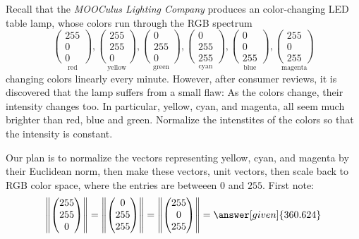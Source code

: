 \documentclass{ximera}
\begin{document}
\begin{example}
  Recall that the \textit{MOOCulus Lighting Company} produces an color-changing LED table lamp, whose colors run through the RGB spectrum
    \[
    \underset{\text{red}}{\begin{pmatrix}255\\0\\0\end{pmatrix}},
    \underset{\text{yellow}}{\begin{pmatrix}255\\255\\0\end{pmatrix}},
    \underset{\text{green}}{\begin{pmatrix}0\\255\\0\end{pmatrix}},
    \underset{\text{cyan}}{\begin{pmatrix}0\\255\\255\end{pmatrix}},
    \underset{\text{blue}}{\begin{pmatrix}0\\0\\255\end{pmatrix}},
    \underset{\text{magenta}}{\begin{pmatrix}255\\0\\255\end{pmatrix}}
    \]
    changing colors linearly every minute. However, after consumer
    reviews, it is discovered that the lamp suffers from a small flaw:
    As the colors change, their intensity changes too. In particular,
    yellow, cyan, and magenta, all seem much brighter than red, blue
    and green. Normalize the intenstites of the colors so that the
    intensity is constant.
  \begin{explanation}
   Our plan is to normalize the vectors representing yellow, cyan, and
   magenta by their Euclidean norm, then make these vectors, unit
   vectors, then scale back to RGB color space, where the entries are
   betweeen $0$ and $255$. First note:
   \[
   \left\|\begin{pmatrix}255\\255\\0\end{pmatrix}\right\| =  \left\|\begin{pmatrix}0\\255\\255\end{pmatrix}\right\| =  \left\|\begin{pmatrix}255\\0\\255\end{pmatrix}\right\| = \answer[given]{360.624}
   \]
     
  \end{explanation}
\end{example}
\end{document}
